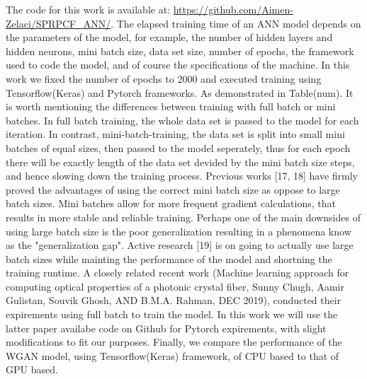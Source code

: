 \documentclass[draft, a4, 10pt, onecolumn]{IEEEtran}
\begin{document}
The code for this work is available at: \url{https://github.com/Aimen-Zelaci/SPRPCF_ANN/}.
\newline
The elapsed training time of an ANN model depends on the parameters of the model, for example, the number of hidden layers and hidden neurons, mini batch size, data set size, number of epochs, the framework used to code the model, and of course the specifications of the machine.
In this work we fixed the number of epochs to 2000 and executed training using Tensorflow(Keras) and Pytorch frameworks. As demonstrated in Table(num). It is worth mentioning the differences between training with full batch or mini batches. In full batch training, the whole data set is passed to the model for each iteration. In contrast, mini-batch-training, the data set is split into small mini batches of equal sizes, then passed to the model seperately, thus for each epoch there will be exactly length  of the data set devided by the mini batch size steps, and hence slowing down the training process. Previous works [17, 18] have firmly proved the advantages of using the correct mini batch size as oppose to large batch sizes. Mini batches allow for more frequent gradient calculations, that results in more stable and reliable training. Perhaps one of the main downsides of using large batch size is the poor generalization resulting in a phenomena know as the "generalization gap". Active research [19] is on going to actually use large batch sizes while mainting the performance of the model and shortning the training runtime. A closely related recent work (Machine learning approach for computing optical properties of a photonic crystal fiber, Sunny Chugh, Aamir Gulistan, Souvik Ghosh, AND B.M.A. Rahman, DEC 2019), conducted their expirements using full batch to train the model. In this work we will use the latter paper availabe code on Github for Pytorch expirements, with slight modifications to fit our purposes. Finally, we compare the performance of the WGAN model, using Tensorflow(Keras) framework, of CPU based to that of GPU based.
\end{document}
